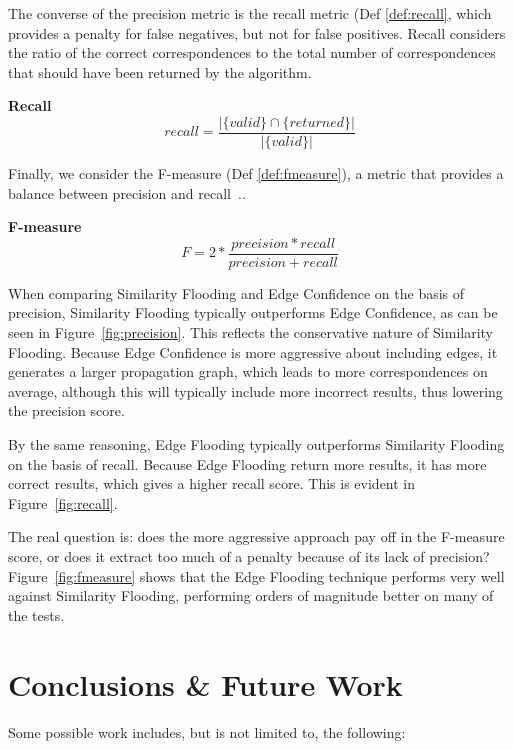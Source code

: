 \documentclass[letterpaper,twocolumn,12pt]{article}
\begin{document}
The converse of the precision metric is the recall metric (Def \ref{def:recall}, which provides a penalty for false negatives, but not for false positives. 
Recall considers the ratio of the correct correspondences to the total number of correspondences that should have been returned by the algorithm.

\begin{defn}
\textbf{Recall}
\label{def:recall}
$$
	recall = \frac{|\{valid \} \cap  \{returned \}|}{|\{valid \}|}
$$
\end{defn}

Finally, we consider the F-measure (Def \ref{def:fmeasure}), a metric that provides a balance between precision and recall~\cite{rijsbergen:1979:ir}.. 

\begin{defn}
				\textbf{F-measure}
\label{def:fmeasure}
$$
	F = 2*\frac{precision * recall}{precision + recall}	
$$
\end{defn}

When comparing Similarity Flooding and Edge Confidence on the basis of precision, Similarity Flooding typically outperforms Edge Confidence, as can be seen in Figure~\ref{fig:precision}. 
This reflects the conservative nature of Similarity Flooding.
Because Edge Confidence is more aggressive about including edges, it generates a larger propagation graph, which leads to more correspondences on average, although this will typically include more incorrect results, thus lowering the precision score.

By the same reasoning, Edge Flooding typically outperforms Similarity Flooding on the basis of recall. 
Because Edge Flooding return more results, it has more correct results, which gives a higher recall score. 
This is evident in Figure~\ref{fig:recall}.

The real question is: does the more aggressive approach pay off in the F-measure score, or does it extract too much of a penalty because of its lack of precision?
Figure~\ref{fig:fmeasure} shows that the Edge Flooding technique performs very well against Similarity Flooding, performing orders of magnitude better on many of  the tests.

\section{Conclusions \& Future Work}
\label{sec:conclusions}

Some possible work includes, but is not limited to, the following:
\end{document}
